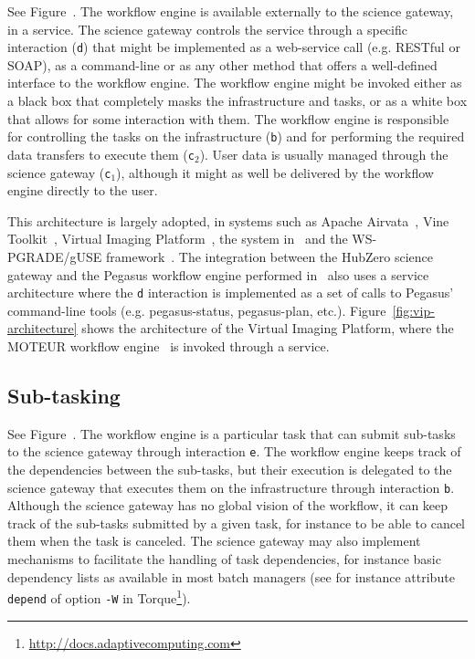 \documentclass[preprint,3p,twocolumn]{elsarticle}
\begin{document}
See Figure~. The workflow engine is available
externally to the science gateway, in a service. The science gateway
controls the service through a specific interaction (\texttt{d}) that
might be implemented as a web-service call (e.g. RESTful or SOAP), as
a command-line or as any other method that offers a well-defined
interface to the workflow engine. The workflow engine might be invoked
either as a black box that completely masks the infrastructure and
tasks, or as a white box that allows for some interaction with
them. The workflow engine is responsible for controlling the tasks on
the infrastructure (\texttt{b}) and for performing the required data
transfers to execute them (\texttt{c$_2$}). User data is usually
managed through the science gateway (\texttt{c$_1$}), although it
might as well be delivered by the workflow engine directly to the
user.

This architecture is largely adopted, in systems such as Apache
Airvata~\cite{marru2011apache}, Vine
Toolkit~\cite{DBLP:journals/scpe/SzejnfeldDKKKKLPTWDNW10}, Virtual
Imaging Platform~\cite{GLAT-13}, the system
in~\cite{wu2010accelerating} and the WS-PGRADE/gUSE
framework~\cite{Kacsuk2012}. The integration between the
HubZero science gateway and the Pegasus workflow engine performed
in~\cite{CPE:CPE3257} also uses a service architecture where the
\texttt{d} interaction is implemented as a set of calls to Pegasus'
command-line tools (e.g. pegasus-status, pegasus-plan,
etc.). Figure~\ref{fig:vip-architecture} shows the architecture of the
Virtual Imaging Platform, where the MOTEUR workflow
engine~\cite{GLAT-08i} is invoked through a service.

\subsection{Sub-tasking}

See Figure~. The workflow engine is a particular
task that can submit sub-tasks to the science gateway through
interaction \texttt{e}. The workflow engine keeps track of the
dependencies between the sub-tasks, but their execution is delegated to
the science gateway that executes them on the infrastructure through
interaction \texttt{b}. Although the science gateway has no global
vision of the workflow, it can keep track of the sub-tasks submitted
by a given task, for instance to be able to cancel them when the task
is canceled. The science gateway may also implement mechanisms to
facilitate the handling of task dependencies, for instance basic
dependency lists as available in most batch managers (see for instance
attribute \texttt{depend} of option \texttt{-W} in
Torque\footnote{\url{http://docs.adaptivecomputing.com}}).
\end{document}
